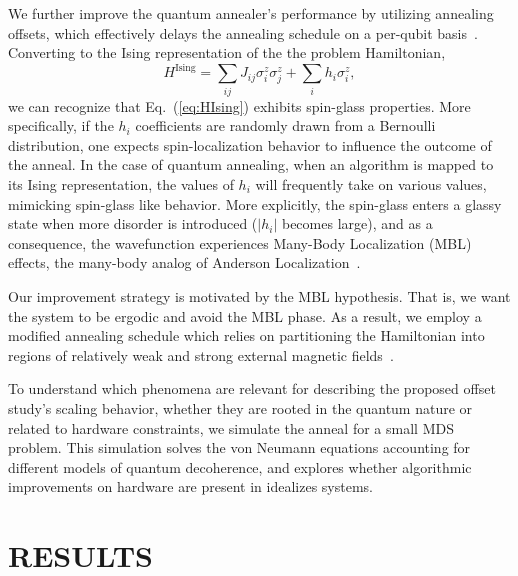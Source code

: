 \documentclass[prd,twocolumn,tightenlines,preprintnumbers,showpacs,superscriptaddress,notitlepage,nofootinbib,eqsecnum,floatfix,longbibliography,aps,10pt]{revtex4-2}
\begin{document}
We further improve the quantum annealer's performance by utilizing annealing offsets, which effectively delays the annealing schedule on a per-qubit basis~\cite{PhysRevA.96.042322,hsu2018quantum,10.1007/978-3-030-14082-3_14}.
Converting to the Ising representation of the the problem Hamiltonian,
\begin{equation}
    \label{eq:HIsing}
     H^{\textrm{Ising}} = \sum_{ij} J_{ij} \sigma^z_i \sigma^z_j + \sum_i h_i \sigma^z_i ,
\end{equation}
we can recognize that Eq.~(\ref{eq:HIsing}) exhibits spin-glass properties. More specifically, if the $h_i$ coefficients are randomly drawn from a Bernoulli distribution, one expects spin-localization behavior to influence the outcome of the anneal.
In the case of quantum annealing, when an algorithm is mapped to its Ising representation, the values of $h_i$ will frequently take on various values, mimicking spin-glass like behavior.
More explicitly, the spin-glass enters a glassy state when more disorder is introduced ($|h_i|$ becomes large), and as a consequence, the wavefunction experiences Many-Body Localization (MBL) effects, the many-body analog of Anderson Localization~\cite{doi:10.1146/annurev-conmatphys-031214-014726,PhysRevE.90.022103,RevModPhys.91.021001}.

Our improvement strategy is motivated by the MBL hypothesis.
That is, we want the system to be ergodic and avoid the MBL phase.
As a result, we employ a modified annealing schedule which relies on partitioning the Hamiltonian into regions of relatively weak and strong external magnetic fields~\cite{doi:10.7566/JPSJ.89.044001}.


To understand which phenomena are relevant for describing the proposed offset study's scaling behavior, whether they are rooted in the quantum nature or related to hardware constraints, we simulate the anneal for a small MDS problem. This simulation solves the von Neumann equations accounting for different models of quantum decoherence, and explores whether algorithmic improvements on hardware are present in idealizes systems.


\section{RESULTS}
\label{sec:results}
\end{document}
